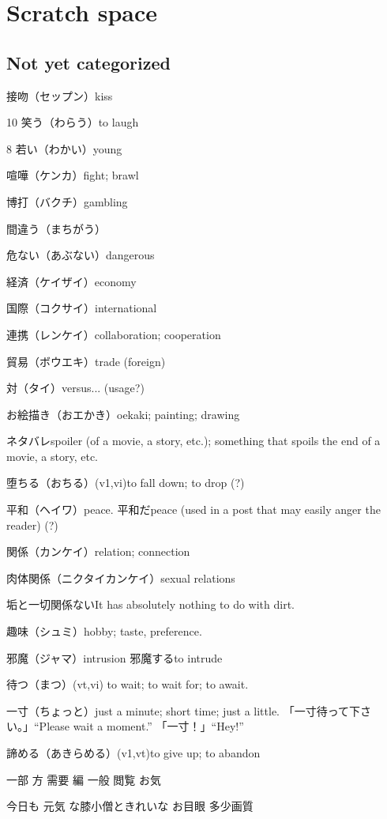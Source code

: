 \chapter{Scratch space}

\section{Not yet categorized}

接吻（セップン）kiss

10 笑う（わらう）to laugh

8 若い（わかい）young

喧嘩（ケンカ）fight; brawl

博打（バクチ）gambling

間違う（まちがう）

危ない（あぶない）dangerous

経済（ケイザイ）economy

国際（コクサイ）international

連携（レンケイ）collaboration; cooperation

貿易（ボウエキ）trade (foreign)

対（タイ）versus... (usage?)

お絵描き（おエかき）oekaki; painting; drawing

ネタバレspoiler (of a movie, a story, etc.); something that spoils the end of a movie, a story, etc.

堕ちる（おちる）(v1,vi)to fall down; to drop (?)

平和（ヘイワ）peace.
平和だpeace (used in a post that may easily anger the reader) (?)

関係（カンケイ）relation; connection

肉体関係（ニクタイカンケイ）sexual relations

垢と一切関係ないIt has absolutely nothing to do with dirt.

趣味（シュミ）hobby; taste, preference.

邪魔（ジャマ）intrusion
邪魔するto intrude

待つ（まつ）(vt,vi) to wait; to wait for; to await.

一寸（ちょっと）just a minute; short time; just a little.
「一寸待って下さい。」``Please wait a moment.''
「一寸！」``Hey!''

諦める（あきらめる）(v1,vt)to give up; to abandon

一部
方
需要
編
一般
閲覧
お気

今日も
元気
な膝小僧ときれいな
お目眼
多少画質

